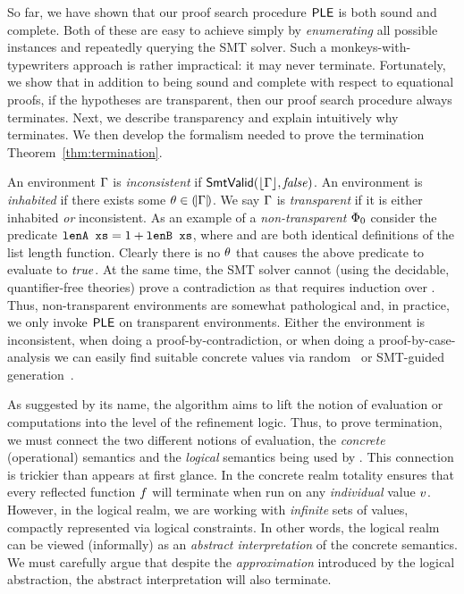 So far, we have shown that our proof search
procedure $\mathsf{PLE}$ is both sound and complete.
%
Both of these are easy to achieve
simply by \emph{enumerating} all
possible instances and repeatedly
querying the SMT solver.
%
Such a monkeys-with-typewriters
approach is rather impractical: it
may never terminate.
%
Fortunately, we show that in
addition to being sound and complete
with respect to equational proofs,
if the hypotheses are transparent,
then our proof search procedure always
terminates.
%
Next, we describe transparency and
explain intuitively why \pbesym
terminates.
%
We then develop the formalism needed
to prove the termination
Theorem~\ref{thm:termination}.

%
An environment $\Gamma$ is \emph{inconsistent}
if $\mathsf{SmtValid}(\lfloor \Gamma\rfloor , \mathit{false})$.
%
An environment \env is \emph{inhabited}
if there exists some $\theta \in (\!|\Gamma|\!)$.
%
We say $\Gamma$ is \emph{transparent}
if it is either inhabited \emph{or}
inconsistent.
%
As an example of a \emph{non-transparent}
$\Phi_0$ consider the predicate
$\texttt{lenA xs} = 1 + \texttt{lenB xs}$,
where  and  are both
identical definitions of the list length
function.
%
Clearly there is no $\theta$ that causes
the above predicate to evaluate to $\mathit{true}$.
%
At the same time, the SMT solver cannot
(using the decidable, quantifier-free theories)
prove a contradiction as that requires
induction over .
%
Thus, non-transparent environments are
somewhat pathological and, in practice,
we only invoke $\mathsf{PLE}$ on transparent
environments.
%
Either the environment is inconsistent,
\eg when doing a proof-by-contradiction,
or \eg when doing a proof-by-case-analysis
we can easily find suitable concrete
values via random~\cite{Claessen00}
or SMT-guided generation~\cite{Seidel15}.

%
As suggested by its name, the
\pbesym algorithm aims to lift the
notion of evaluation or computations
into the level of the refinement logic.
%
Thus, to prove termination, we must
connect the two different notions of
evaluation,
the \emph{concrete} (operational) semantics
and
the \emph{logical} semantics being used by \pbesym.
%
This connection is trickier than appears at first glance.
%
In the concrete realm totality ensures that every
reflected function $f$ will terminate when
run on any \emph{individual} value $v$.
%
However, in the logical realm, we are working with
\emph{infinite} sets of values, compactly represented
via logical constraints.
%
In other words, the logical realm can be viewed
(informally) as an \emph{abstract interpretation}
of the concrete semantics. We must carefully argue
that despite the \emph{approximation} introduced
by the logical abstraction, the abstract
interpretation will also terminate.


